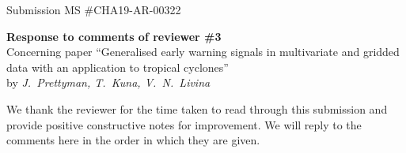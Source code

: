\documentclass[12pt]{article}
\begin{document}
Submission MS \#CHA19-AR-00322


\begin{center}
{\bf Response to comments of reviewer \#3}\\
\vspace{2mm}
Concerning paper ``Generalised early warning
signals in multivariate and gridded data with an application to
tropical cyclones''\\[5pt]
by {\it J.~Prettyman, T.~Kuna, V.~N.~Livina}
\end{center}

\vspace{3mm}

We thank the reviewer for the time taken to read through this submission and provide positive constructive notes for improvement. We will reply to the comments here in the order in which they are given.
\end{document}
